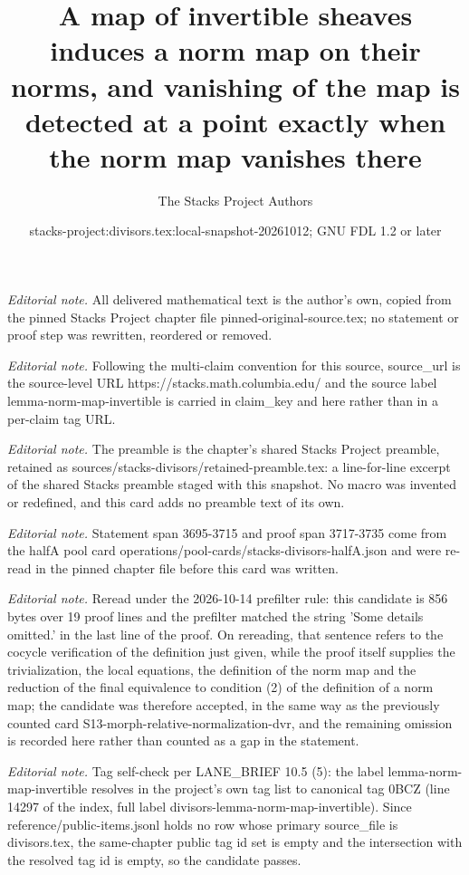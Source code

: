 \documentclass[10pt,a4paper]{amsart}
\title{A map of invertible sheaves induces a norm map on their norms, and vanishing of the map is detected at a point exactly when the norm map vanishes there}
\author{The Stacks Project Authors}
\date{stacks-project:divisors.tex:local-snapshot-20261012; GNU FDL 1.2 or later}
\theoremstyle{plain}
\theoremstyle{definition}
\theoremstyle{remark}
\numberwithin{equation}{subsection}
\begin{document}
\maketitle
\noindent\textit{Editorial note.} All delivered mathematical text is the author's own, copied from the pinned Stacks Project chapter file pinned-original-source.tex; no statement or proof step was rewritten, reordered or removed.\par\medskip
\noindent\textit{Editorial note.} Following the multi-claim convention for this source, source\_url is the source-level URL https://stacks.math.columbia.edu/ and the source label lemma-norm-map-invertible is carried in claim\_key and here rather than in a per-claim tag URL.\par\medskip
\noindent\textit{Editorial note.} The preamble is the chapter's shared Stacks Project preamble, retained as sources/stacks-divisors/retained-preamble.tex: a line-for-line excerpt of the shared Stacks preamble staged with this snapshot. No macro was invented or redefined, and this card adds no preamble text of its own.\par\medskip
\noindent\textit{Editorial note.} Statement span 3695-3715 and proof span 3717-3735 come from the halfA pool card operations/pool-cards/stacks-divisors-halfA.json and were re-read in the pinned chapter file before this card was written.\par\medskip
\noindent\textit{Editorial note.} Reread under the 2026-10-14 prefilter rule: this candidate is 856 bytes over 19 proof lines and the prefilter matched the string 'Some details omitted.' in the last line of the proof. On rereading, that sentence refers to the cocycle verification of the definition just given, while the proof itself supplies the trivialization, the local equations, the definition of the norm map and the reduction of the final equivalence to condition (2) of the definition of a norm map; the candidate was therefore accepted, in the same way as the previously counted card S13-morph-relative-normalization-dvr, and the remaining omission is recorded here rather than counted as a gap in the statement.\par\medskip
\noindent\textit{Editorial note.} Tag self-check per LANE\_BRIEF 10.5 (5): the label lemma-norm-map-invertible resolves in the project's own tag list to canonical tag 0BCZ (line 14297 of the index, full label divisors-lemma-norm-map-invertible). Since reference/public-items.jsonl holds no row whose primary source\_file is divisors.tex, the same-chapter public tag id set is empty and the intersection with the resolved tag id is empty, so the candidate passes.\par\medskip
\end{document}
